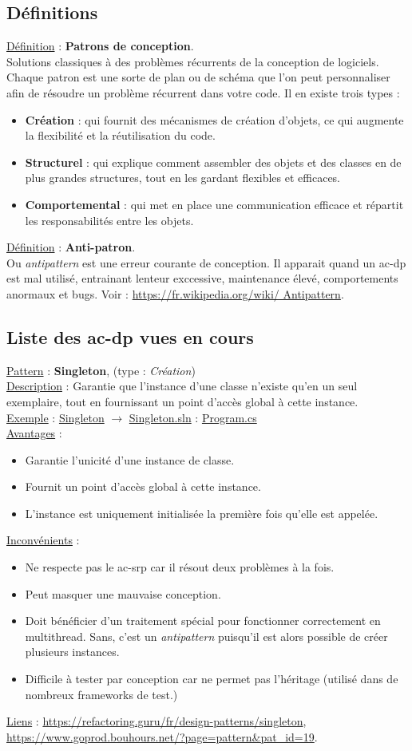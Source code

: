 \documentclass[a4paper,12pt,twoside]{article}
\newcommand{\exemplepath}{../Exercices}
\newcommand{\urlcolor}{magenta}  %
\newcommand{\foldercolor}{orange} %
\newcommand{\cscolor}{green!60!black} %
\newcommand{\slncolor}{violet} %
\newcommand{\defi}[2]{\noindent\underline{Définition} : \textbf{#1}.\\ \indent #2}
\newcommand{\csref}[2]{\hypersetup{urlcolor=\cscolor}\href{file:\exemplepath /#1.cs}{#2.cs}\hypersetup{urlcolor=\urlcolor}}
\newcommand{\slnref}[2]{\hypersetup{urlcolor=\slncolor}\href{file:\exemplepath /#1.sln}{#2.sln}\hypersetup{urlcolor=\urlcolor}}
\newcommand{\folderref}[2]{\hypersetup{urlcolor=\foldercolor}\href{file:\exemplepath /#1/.}{#2}\hypersetup{urlcolor=\urlcolor}}
\newcommand{\dpat}[7]{
\noindent \underline{Pattern} : \textbf{#1}, \indent (type : \textit{#2}) \\
\underline{Description} : \indent #3 \\
\underline{Exemple} : \indent #4 \\
\noindent \underline{Avantages} : 
\begin{itemize}
 #5
\end{itemize}
\noindent \underline{Inconvénients} : 
\begin{itemize}
 #6 
\end{itemize}
\underline{Liens} : #7 
}
\begin{document}
\subsection{Définitions}

\defi{Patrons de conception}{Solutions classiques à des problèmes récurrents de la conception de logiciels. Chaque patron est une sorte de plan ou de schéma que l'on peut personnaliser afin de résoudre un problème récurrent dans votre code. Il en existe trois types :
\begin{itemize}
 \item \textbf{Création} : qui fournit des mécanismes de création d'objets, ce qui augmente la flexibilité et la réutilisation du code.
 \item \textbf{Structurel} : qui explique comment assembler des objets et des classes en de plus grandes structures, tout en les gardant flexibles et efficaces.
 \item \textbf{Comportemental} : qui met en place une communication efficace et répartit les responsabilités entre les objets.\\
\end{itemize}
}

\defi{Anti-patron}{Ou \textit{antipattern} est une erreur courante de conception. Il apparait quand un \gls{ac-dp} est mal utilisé, entrainant lenteur exccessive, maintenance élevé, comportements anormaux et bugs. Voir : \url{https://fr.wikipedia.org/wiki/
Antipattern}.} 

\subsection{Liste des \gls{ac-dp} vues en cours}

\dpat{Singleton}
{Création}
{Garantie que l'instance d'une classe n'existe qu'en un seul exemplaire, tout en fournissant un point d'accès global à cette instance.}
{\folderref{Singleton}{Singleton} $\to$ \slnref{Singleton/Singleton}{Singleton} : \indent \csref{Singleton/Singleton/Program}{Program}}
{\item Garantie l'unicité d'une instance de classe. 
\item Fournit un point d'accès global à cette instance.
\item L'instance est uniquement initialisée la première fois qu'elle est appelée.}
{\item Ne respecte pas le \gls{ac-srp} car il résout deux problèmes à la fois.
\item Peut masquer une mauvaise conception.
\item Doit bénéficier d'un traitement spécial pour fonctionner correctement en multithread. Sans, c'est un \textit{antipattern} puisqu'il est alors possible de créer plusieurs instances.
\item Difficile à tester par conception car ne permet pas l'héritage (utilisé dans de nombreux frameworks de test.)}
{\url{https://refactoring.guru/fr/design-patterns/singleton}, \\ \url{https://www.goprod.bouhours.net/?page=pattern&pat_id=19}.} \\
\end{document}

